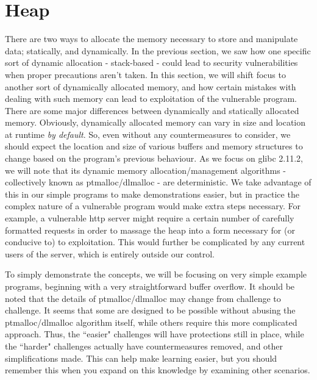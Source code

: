 \section{Heap}
There are two ways to allocate the memory necessary to store and manipulate data;
statically, and dynamically. In the previous section, we saw how one
specific sort of dynamic allocation - stack-based - could lead to
security vulnerabilities when proper precautions aren't taken. In this section,
we will shift focus to another sort of dynamically allocated memory, and how
certain mistakes with dealing with such memory can lead to exploitation
of the vulnerable program. There are some major differences between
dynamically and statically allocated memory. Obviously, dynamically
allocated memory can vary in size and location at runtime \emph{by default}.
So, even without any countermeasures to consider, we should expect
the location and size of various buffers and memory structures to change
based on the program's previous behaviour. As we focus on glibc 2.11.2,
we will note that its dynamic memory allocation/management algorithms - 
collectively known as ptmalloc/dlmalloc - are deterministic. We take
advantage of this in our simple programs to make demonstrations easier,
but in practice the complex nature of a vulnerable program would make
extra steps necessary. For example, a vulnerable http server might
require a certain number of carefully formatted requests in order
to massage the heap into a form necessary for (or conducive to) to exploitation.
This would further be complicated by any current users of the server,
which is entirely outside our control.

To simply demonstrate the concepts, we will be focusing on very simple
example programs, beginning with a very straightforward buffer overflow.
It should be noted that the details of ptmalloc/dlmalloc may change from
challenge to challenge. It seems that some are designed to be possible
without abusing the ptmalloc/dlmalloc algorithm itself, while others require
this more complicated approach. Thus, the ``easier" challenges will have
protections still in place, while the ``harder" challenges actually have
countermeasures removed, and other simplifications made. This can help
make learning easier, but you should remember this when you expand
on this knowledge by examining other scenarios.






